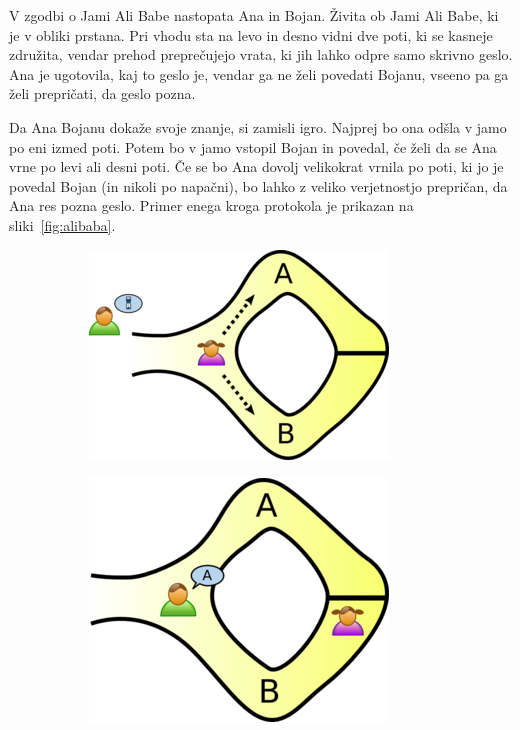 \documentclass[isrm2, tisk]{fmfdelo}
\begin{document}
\begin{primer}
    V zgodbi o Jami Ali Babe nastopata Ana in Bojan. Živita ob Jami Ali Babe, ki je v obliki prstana. 
    Pri vhodu sta na levo in desno vidni dve poti, ki se kasneje združita, vendar prehod preprečujejo 
    vrata, ki jih lahko odpre samo skrivno geslo. Ana je ugotovila, kaj to geslo je, vendar ga ne želi 
    povedati Bojanu, vseeno pa ga želi prepričati, da geslo pozna. 

    Da Ana Bojanu dokaže svoje znanje, si zamisli igro. Najprej bo ona odšla v jamo po eni izmed poti. 
    Potem bo v jamo vstopil Bojan in povedal, če želi da se Ana vrne po levi ali desni poti. Če se 
    bo Ana dovolj velikokrat vrnila po poti, ki jo je povedal Bojan (in nikoli po napačni), bo lahko 
    z veliko verjetnostjo prepričan, da Ana res pozna geslo. Primer enega kroga protokola je prikazan 
    na sliki~\ref{fig:alibaba}. 
    \begin{figure}[h!]
      \centering
        \begin{subfigure}{0.28\textwidth}
            \includegraphics[width=\textwidth]{images/zkp1.png}
        \end{subfigure}
        \hspace{0.25cm}
        \begin{subfigure}{0.25\textwidth}
            \includegraphics[width=\textwidth]{images/zkp2.png}

\end{subfigure}
\end{figure}
\end{primer}
\end{document}

